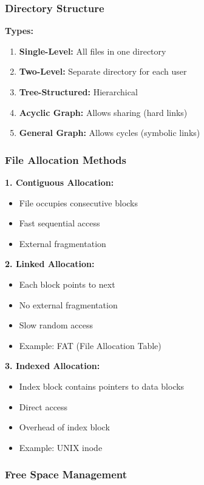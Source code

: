 \documentclass[11pt,a4paper]{article}
\begin{document}
\subsubsection{Directory Structure}

\textbf{Types:}
\begin{enumerate}
    \item \textbf{Single-Level:} All files in one directory
    \item \textbf{Two-Level:} Separate directory for each user
    \item \textbf{Tree-Structured:} Hierarchical
    \item \textbf{Acyclic Graph:} Allows sharing (hard links)
    \item \textbf{General Graph:} Allows cycles (symbolic links)
\end{enumerate}

\subsubsection{File Allocation Methods}

\textbf{1. Contiguous Allocation:}
\begin{itemize}
    \item File occupies consecutive blocks
    \item Fast sequential access
    \item External fragmentation
\end{itemize}

\textbf{2. Linked Allocation:}
\begin{itemize}
    \item Each block points to next
    \item No external fragmentation
    \item Slow random access
    \item Example: FAT (File Allocation Table)
\end{itemize}

\textbf{3. Indexed Allocation:}
\begin{itemize}
    \item Index block contains pointers to data blocks
    \item Direct access
    \item Overhead of index block
    \item Example: UNIX inode
\end{itemize}

\subsubsection{Free Space Management}
\end{document}
